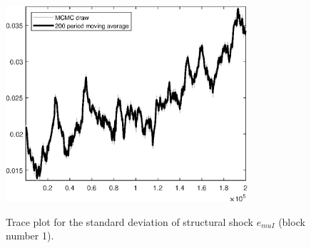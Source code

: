 \begin{figure}[H]
\centering
  \includegraphics[width=0.8\textwidth]{BRS_sectoral_rest/graphs/TracePlot_SE_e_muI_blck_1}\\
    \caption{Trace plot for the standard deviation of structural shock ${e_{muI}}$ (block number 1).}
\end{figure}
